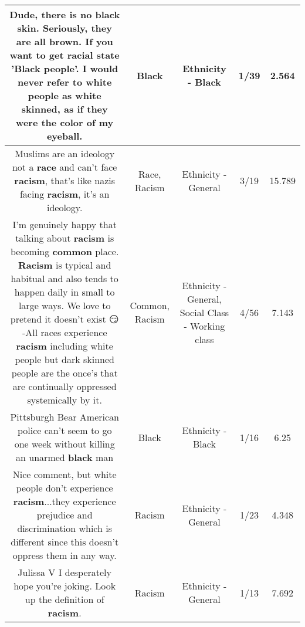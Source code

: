 \documentclass[11pt]{article}
\newlength\mylength
\begin{document}
\begin{center}
\begin{longtable}{|C{.65\mylength}|C{.30\mylength}|C{.12\mylength}|C{.12\mylength}|C{.12\mylength}|}
  \small Dude, there is no \textbf{black} skin. Seriously, they are all brown. If you want to get racial state '\textbf{Black} people'. I would never refer to white people as white skinned, as if they were the color of my eyeball.\normalsize   & Black & Ethnicity - Black & 1/39 & 2.564 \\  \hline
  \small Muslims are an ideology not a \textbf{race} and can't face \textbf{racism}, that's like nazis facing \textbf{racism}, it's an ideology.\normalsize   & Race, Racism & Ethnicity - General & 3/19 & 15.789 \\  \hline
  \small I'm genuinely happy that talking about \textbf{racism} is becoming \textbf{common} place. \textbf{Racism} is typical and habitual and also tends to happen daily in small to large ways.   We love to pretend it doesn't exist 😏 -All races experience \textbf{racism} including white people but dark skinned people are the once's that are continually oppressed systemically by it.\normalsize   & Common, Racism & Ethnicity - General, Social Class - Working class & 4/56 & 7.143 \\  \hline
  \small Pittsburgh Bear American police can't seem to go one week without killing an unarmed \textbf{black} man\normalsize   & Black & Ethnicity - Black & 1/16 & 6.25 \\  \hline
  \small Nice comment, but white people don't experience \textbf{racism}...they experience prejudice and discrimination which is different since this doesn't oppress them in any way.\normalsize   & Racism & Ethnicity - General & 1/23 & 4.348 \\  \hline
  \small Julissa V I desperately hope you're joking. Look up the definition of \textbf{racism}.\normalsize   & Racism & Ethnicity - General & 1/13 & 7.692 \\  \hline

\end{longtable}
\end{center}
\end{document}
